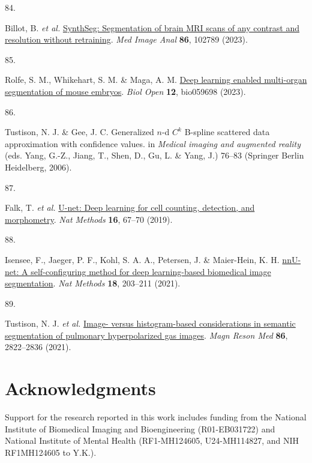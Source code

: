 \documentclass[
  12pt,
]{article}
\newlength{\cslhangindent}
\newlength{\csllabelwidth}
\newenvironment{CSLReferences}[2] %
 {\begin{list}{}{%
  \setlength{\itemindent}{0pt}
  \setlength{\leftmargin}{0pt}
  \setlength{\parsep}{0pt}
  \ifodd #1
   \setlength{\leftmargin}{\cslhangindent}
   \setlength{\itemindent}{-1\cslhangindent}
  \fi
  \setlength{\itemsep}{#2\baselineskip}}}
 {\end{list}}
\newcommand{\CSLLeftMargin}[1]{\parbox[t]{\csllabelwidth}{\strut#1\strut}}
\newcommand{\CSLRightInline}[1]{\parbox[t]{\linewidth - \csllabelwidth}{\strut#1\strut}}
\begin{document}
\begin{CSLReferences}{0}{0}
\CSLLeftMargin{84. }%
\CSLRightInline{Billot, B. \emph{et al.}
\href{https://doi.org/10.1016/j.media.2023.102789}{SynthSeg:
Segmentation of brain MRI scans of any contrast and resolution without
retraining}. \emph{Med Image Anal} \textbf{86}, 102789 (2023).}

\CSLLeftMargin{85. }%
\CSLRightInline{Rolfe, S. M., Whikehart, S. M. \& Maga, A. M.
\href{https://doi.org/10.1242/bio.059698}{Deep learning enabled
multi-organ segmentation of mouse embryos}. \emph{Biol Open}
\textbf{12}, bio059698 (2023).}

\CSLLeftMargin{86. }%
\CSLRightInline{Tustison, N. J. \& Gee, J. C. Generalized \(n\)-d
\(C^k\) {B}-spline scattered data approximation with confidence values.
in \emph{Medical imaging and augmented reality} (eds. Yang, G.-Z.,
Jiang, T., Shen, D., Gu, L. \& Yang, J.) 76--83 (Springer Berlin
Heidelberg, 2006).}

\CSLLeftMargin{87. }%
\CSLRightInline{Falk, T. \emph{et al.}
\href{https://doi.org/10.1038/s41592-018-0261-2}{U-net: Deep learning
for cell counting, detection, and morphometry}. \emph{Nat Methods}
\textbf{16}, 67--70 (2019).}

\CSLLeftMargin{88. }%
\CSLRightInline{Isensee, F., Jaeger, P. F., Kohl, S. A. A., Petersen, J.
\& Maier-Hein, K. H.
\href{https://doi.org/10.1038/s41592-020-01008-z}{nnU-net: A
self-configuring method for deep learning-based biomedical image
segmentation}. \emph{Nat Methods} \textbf{18}, 203--211 (2021).}

\CSLLeftMargin{89. }%
\CSLRightInline{Tustison, N. J. \emph{et al.}
\href{https://doi.org/10.1002/mrm.28908}{Image- versus histogram-based
considerations in semantic segmentation of pulmonary hyperpolarized gas
images}. \emph{Magn Reson Med} \textbf{86}, 2822--2836 (2021).}

\end{CSLReferences}

\clearpage

\section*{Acknowledgments}\label{acknowledgments}

Support for the research reported in this work includes funding from the
National Institute of Biomedical Imaging and Bioengineering
(R01-EB031722) and National Institute of Mental Health (RF1-MH124605,
U24-MH114827, and NIH RF1MH124605 to Y.K.).
\end{document}
